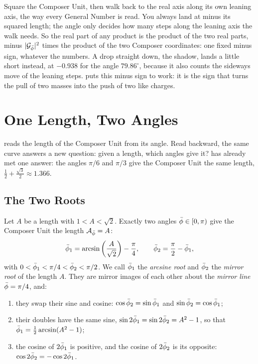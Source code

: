 \begin{plainwords}
Square the Composer Unit, then walk back to the real axis along its own leaning axis, the way every General Number is read. You always land at minus its squared length; the angle only decides how many steps along the leaning axis the walk needs. So the real part of any product is the product of the two real parts, minus $|\mathcal{G}_{\bar{\phi}}|^2$ times the product of the two Composer coordinates: one fixed minus sign, whatever the numbers. A drop straight down, the shadow, lands a little short instead, at $-0.938$ for the angle $79.86^\circ$, because it also counts the sideways move of the leaning steps.  puts this minus sign to work: it is the sign that turns the pull of two masses into the push of two like charges.
\end{plainwords}

\section{One Length, Two Angles}\label{sec:two-roots-math}

 reads the length of the Composer Unit from its angle. Read backward, the same curve answers a new question: given a length, which angles give it?  has already met one answer: the angles $\pi/6$ and $\pi/3$ give the Composer Unit the same length, $\tfrac{1}{2} + \tfrac{\sqrt{3}}{2} \approx 1.366$.

\subsection{The Two Roots}\label{subsec:gn-two-roots}

\begin{theorem}\label{thm:two-roots}
Let $A$ be a length with $1 < A < \sqrt{2}$. Exactly two angles $\bar{\phi} \in [0, \pi)$ give the Composer Unit the length $\mathcal{A}_{\bar{\phi}} = A$:
\[
\bar{\phi}_1 = \arcsin\left(\frac{A}{\sqrt{2}}\right) - \frac{\pi}{4}, \qquad \bar{\phi}_2 = \frac{\pi}{2} - \bar{\phi}_1 ,
\]
with $0 < \bar{\phi}_1 < \pi/4 < \bar{\phi}_2 < \pi/2$. We call $\bar{\phi}_1$ the \emph{arcsine root} and $\bar{\phi}_2$ the \emph{mirror root} of the length $A$. They are mirror images of each other about the \emph{mirror line} $\bar{\phi} = \pi/4$, and:
\begin{enumerate}
  \item they swap their sine and cosine: $\cos\bar{\phi}_2 = \sin\bar{\phi}_1$ and $\sin\bar{\phi}_2 = \cos\bar{\phi}_1$;
  \item their doubles have the same sine, $\sin 2\bar{\phi}_1 = \sin 2\bar{\phi}_2 = A^2 - 1$, so that $\bar{\phi}_1 = \tfrac{1}{2}\arcsin(A^2 - 1)$;
  \item the cosine of $2\bar{\phi}_1$ is positive, and the cosine of $2\bar{\phi}_2$ is its opposite: $\cos 2\bar{\phi}_2 = -\cos 2\bar{\phi}_1$.
\end{enumerate}
\end{theorem}

